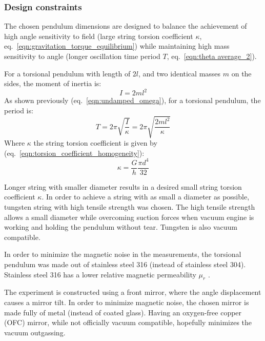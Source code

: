 \documentclass[\main/master.tex]{subfiles}
\begin{document}
\subsubsection{Design constraints}
\par\noindent
The chosen pendulum dimensions are designed to balance the achievement of high angle sensitivity to field (large string torsion coefficient $\kappa$, eq.~\ref{eqn:gravitation_torque_equilibrium}) while maintaining high mass sensitivity to angle (longer oscillation time period $T$, eq.~\ref{eqn:theta average_2}). 
\par\noindent
For a torsional pendulum with length of $2l$, and two identical masses $m$ on the sides, the moment of inertia is:
\begin{equation}
I = 2ml^2     \label{eqn:moment_inertia_2}
\end{equation} 
As shown previously (eq.~\ref{eqn:undamped_omega}), for a torsional pendulum, the period is:
\begin{equation}
T = 2\pi\sqrt{\frac{I}{\kappa}}= 2\pi\sqrt{\frac{2ml^2}{\kappa}}   \label{eqn:undamped_motion_equation_4}
\end{equation}
Where $\kappa$ the string torsion coefficient is given by (eq.~\ref{eqn:torsion_coefficient_homogeneity}):
\begin{equation}
\kappa = \frac{G}{h} \frac{\pi d^4}{32}    \label{eqn:torsion_coefficient}
\end{equation}
\par\noindent
Longer string with smaller diameter results in a desired small string torsion coefficient $\kappa$. In order to achieve a string with as small a diameter as possible, tungsten string with high tensile strength was chosen. The high tensile strength allows a small diameter while overcoming suction forces when vacuum engine is working and holding the pendulum without tear. Tungsten is also vacuum compatible. 
\par\noindent
In order to minimize the magnetic noise in the measurements, the torsional pendulum was made out of stainless steel 316 (instead of stainless steel 304). Stainless steel 316 has a lower relative magnetic permeability $\mu_r$ \cite{SS316}.
\par\noindent
The experiment is constructed using a front mirror, where the angle displacement causes a mirror tilt. In order to minimize magnetic noise, the chosen mirror is made fully of metal (instead of coated glass). Having an oxygen-free copper (OFC) mirror, while not officially vacuum compatible, hopefully minimizes the vacuum outgassing.
\end{document}

